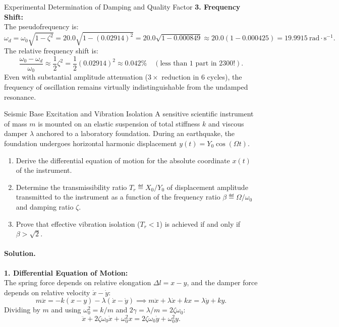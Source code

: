 \begin{workedexample}{Experimental Determination of Damping and Quality Factor}
\textbf{3. Frequency Shift:}\\
The pseudofrequency is:
\[
\omega_d = \omega_0\sqrt{1 - \zeta^2} = 20.0\sqrt{1 - (0.02914)^2} = 20.0\sqrt{1 - 0.000849} \approx 20.0(1 - 0.000425) = 19.9915\ \mathrm{rad\cdot s^{-1}}.
\]
The relative frequency shift is:
\[
\frac{\omega_0 - \omega_d}{\omega_0} \approx \frac{1}{2}\zeta^2 = \frac{1}{2}(0.02914)^2 \approx 0.042\% \quad (\text{less than } 1 \text{ part in } 2300!).
\]
Even with substantial amplitude attenuation ($3\times$ reduction in 6 cycles), the frequency of oscillation remains virtually indistinguishable from the undamped resonance.
\end{workedexample}

\begin{workedexample}{Seismic Base Excitation and Vibration Isolation}
A sensitive scientific instrument of mass $m$ is mounted on an elastic suspension of total stiffness $k$ and viscous damper $\lambda$ anchored to a laboratory foundation. During an earthquake, the foundation undergoes horizontal harmonic displacement $y(t) = Y_0 \cos(\Omega t)$.
\begin{enumerate}[leftmargin=1.4em,itemsep=3pt]
  \item Derive the differential equation of motion for the absolute coordinate $x(t)$ of the instrument.
  \item Determine the transmissibility ratio $T_r \eqdef X_0 / Y_0$ of displacement amplitude transmitted to the instrument as a function of the frequency ratio $\beta \eqdef \Omega/\omega_0$ and damping ratio $\zeta$.
  \item Prove that effective vibration isolation ($T_r < 1$) is achieved if and only if $\beta > \sqrt{2}$.
\end{enumerate}

\paragraph{Solution.}
\textbf{1. Differential Equation of Motion:}\\
The spring force depends on relative elongation $\Delta l = x - y$, and the damper force depends on relative velocity $\dot{x} - \dot{y}$:
\[
m \ddot{x} = -k(x - y) - \lambda(\dot{x} - \dot{y}) \implies m\ddot{x} + \lambda\dot{x} + kx = \lambda\dot{y} + ky.
\]
Dividing by $m$ and using $\omega_0^2 = k/m$ and $2\gamma = \lambda/m = 2\zeta\omega_0$:
\[
\ddot{x} + 2\zeta\omega_0 \dot{x} + \omega_0^2 x = 2\zeta\omega_0 \dot{y} + \omega_0^2 y.
\]


\end{workedexample}
